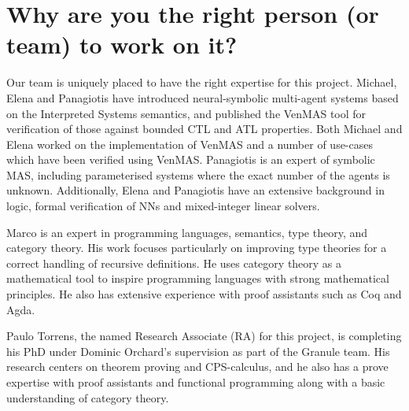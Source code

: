 \documentclass[11pt]{article}
\begin{document}
\section{Why are you the right person (or
team) to work on it?}


Our team is uniquely placed to have the right expertise for this
project. Michael, Elena and Panagiotis have introduced neural-symbolic
multi-agent systems based on the Interpreted Systems semantics, and
published the VenMAS tool for verification of those against bounded
CTL and ATL properties.  Both Michael and Elena worked on the
implementation of VenMAS and a number of use-cases which have been
verified using VenMAS.  Panagiotis is an expert of symbolic MAS,
including parameterised systems where the exact number of the agents
is unknown.  Additionally, Elena and Panagiotis have an extensive
background in logic, formal verification of NNs and mixed-integer
linear solvers.

Marco is an expert in programming languages, semantics, type theory, and
category theory. His work focuses particularly on improving type theories for a
correct handling of recursive definitions. He uses category theory as a
mathematical tool to inspire programming languages with strong mathematical
principles. He also has extensive experience with proof assistants such as Coq
and Agda.

Paulo Torrens, the named Research Associate (RA) for this project, is completing
his PhD under Dominic Orchard's supervision as part of the Granule team. His research centers
on theorem proving and CPS-calculus, and he also has a prove expertise with
proof assistants and functional programming along with a basic understanding of
category theory.



\end{document}
